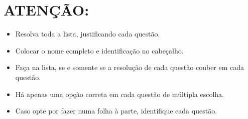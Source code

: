 \documentclass[12pt]{article}
\begin{document}
    \section*{ATENÇÃO:}
    \begin{itemize}[noitemsep]
        \item Resolva toda a lista, justificando cada questão.
        \item Colocar o nome completo e identificação no cabeçalho.
        \item Faça na lista, se e somente se a resolução de cada questão couber em cada questão.
        \item Há apenas uma opção correta em cada questão de múltipla escolha.
        \item Caso opte por fazer numa folha à parte, identifique cada questão.
    \end{itemize}
\end{document}

